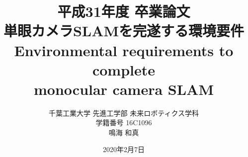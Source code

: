\documentclass[a4paper,11pt]{jsbook}
\begin{document}
\title{平成31年度 卒業論文\\
\vspace{\baselineskip}
単眼カメラSLAMを完遂する環境要件\\
\vspace{10pt}
\fontsize{15pt}{20pt}\selectfont
Environmental requirements to complete\\
\fontsize{15pt}{20pt}\selectfont 
monocular camera SLAM\\ }
\author{千葉工業大学 先進工学部 未来ロボティクス学科\\
学籍番号 16C1096\\
鳴海 和真}




\date{2020年2月7日}

\maketitle

\clearpage



\tableofcontents



\cleardoublepage
{}


%









\newpage
\printindex
\end{document}
